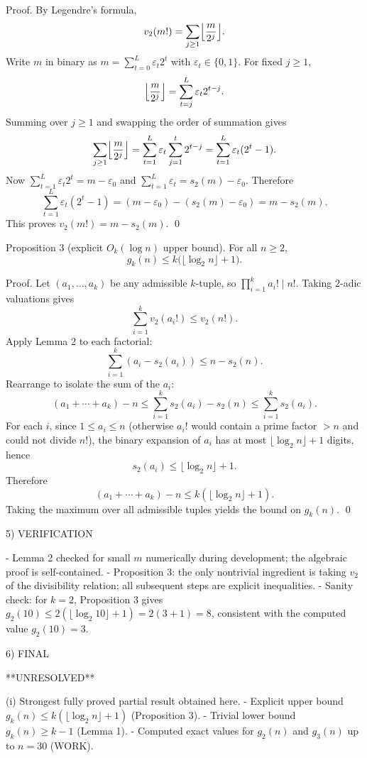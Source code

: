 Proof.
By Legendre's formula,
\[
 v_2(m!)=\sum_{j\ge 1} \Bigl\lfloor\frac{m}{2^j}\Bigr\rfloor.
\]
Write $m$ in binary as $m=\sum_{t=0}^L \varepsilon_t 2^t$ with $\varepsilon_t\in\{0,1\}$.
For fixed $j\ge 1$,
\[
\Bigl\lfloor\frac{m}{2^j}\Bigr\rfloor = \sum_{t=j}^L \varepsilon_t 2^{t-j}.
\]
Summing over $j\ge 1$ and swapping the order of summation gives
\[
\sum_{j\ge 1}\Bigl\lfloor\frac{m}{2^j}\Bigr\rfloor
=\sum_{t=1}^L \varepsilon_t\sum_{j=1}^{t} 2^{t-j}
=\sum_{t=1}^L \varepsilon_t(2^t-1).
\]
Now $\sum_{t=1}^L \varepsilon_t2^t = m-\varepsilon_0$ and $\sum_{t=1}^L \varepsilon_t = s_2(m)-\varepsilon_0$. Therefore
\[
\sum_{t=1}^L \varepsilon_t(2^t-1)=(m-\varepsilon_0)-(s_2(m)-\varepsilon_0)=m-s_2(m).
\]
This proves $v_2(m!)=m-s_2(m)$. \qed

Proposition 3 (explicit $O_k(\log n)$ upper bound).
For all $n\ge 2$,
\[
 g_k(n)\le k\bigl(\lfloor\log_2 n\rfloor+1\bigr).
\]

Proof.
Let $(a_1,\dots,a_k)$ be any admissible $k$-tuple, so $\prod_{i=1}^k a_i!\mid n!$.
Taking $2$-adic valuations gives
\[
\sum_{i=1}^k v_2(a_i!)\le v_2(n!).
\]
Apply Lemma 2 to each factorial:
\[
\sum_{i=1}^k (a_i-s_2(a_i))\le n-s_2(n).
\]
Rearrange to isolate the sum of the $a_i$:
\[
(a_1+\cdots+a_k)-n \le \sum_{i=1}^k s_2(a_i) - s_2(n)\le \sum_{i=1}^k s_2(a_i).
\]
For each $i$, since $1\le a_i\le n$ (otherwise $a_i!$ would contain a prime factor $>n$ and could not divide $n!$), the binary expansion of $a_i$ has at most $\lfloor\log_2 n\rfloor+1$ digits, hence
\[
 s_2(a_i)\le \lfloor\log_2 n\rfloor+1.
\]
Therefore
\[
(a_1+\cdots+a_k)-n \le k(\lfloor\log_2 n\rfloor+1).
\]
Taking the maximum over all admissible tuples yields the bound on $g_k(n)$. \qed

5) VERIFICATION

- Lemma 2 checked for small $m$ numerically during development; the algebraic proof is self-contained.
- Proposition 3: the only nontrivial ingredient is taking $v_2$ of the divisibility relation; all subsequent steps are explicit inequalities.
- Sanity check: for $k=2$, Proposition 3 gives $g_2(10)\le 2(\lfloor\log_2 10\rfloor+1)=2(3+1)=8$, consistent with the computed value $g_2(10)=3$.

6) FINAL

**UNRESOLVED**

(i) Strongest fully proved partial result obtained here.
- Explicit upper bound $g_k(n)\le k(\lfloor\log_2 n\rfloor+1)$ (Proposition 3).
- Trivial lower bound $g_k(n)\ge k-1$ (Lemma 1).
- Computed exact values for $g_2(n)$ and $g_3(n)$ up to $n=30$ (WORK).

